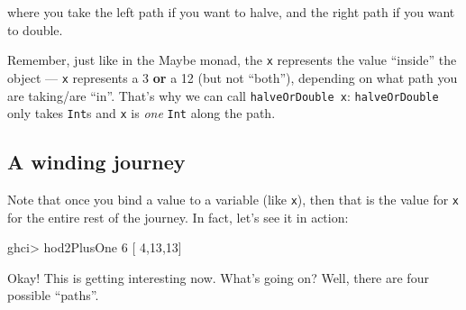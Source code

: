 \documentclass[]{article}
\newenvironment{Shaded}{}{}
\newcommand{\KeywordTok}[1]{\textcolor[rgb]{0.00,0.44,0.13}{\textbf{{#1}}}}
\newcommand{\DataTypeTok}[1]{\textcolor[rgb]{0.56,0.13,0.00}{{#1}}}
\newcommand{\DecValTok}[1]{\textcolor[rgb]{0.25,0.63,0.44}{{#1}}}
\newcommand{\CommentTok}[1]{\textcolor[rgb]{0.38,0.63,0.69}{\textit{{#1}}}}
\newcommand{\OtherTok}[1]{\textcolor[rgb]{0.00,0.44,0.13}{{#1}}}
\newcommand{\FunctionTok}[1]{\textcolor[rgb]{0.02,0.16,0.49}{{#1}}}
\newcommand{\NormalTok}[1]{{#1}}
\begin{document}
where you take the left path if you want to halve, and the right path if
you want to double.

Remember, just like in the Maybe monad, the \texttt{x} represents the
value ``inside'' the object --- \texttt{x} represents a 3 \textbf{or} a
12 (but not ``both''), depending on what path you are taking/are ``in''.
That's why we can call \texttt{halveOrDouble\ x}: \texttt{halveOrDouble}
only takes \texttt{Int}s and \texttt{x} is \emph{one} \texttt{Int} along
the path.

\subsection{A winding journey}\label{a-winding-journey}

Note that once you bind a value to a variable (like \texttt{x}), then
that is the value for \texttt{x} for the entire rest of the journey. In
fact, let's see it in action:

\begin{Shaded}
\end{Shaded}

\begin{Shaded}
\begin{Highlighting}[]
\NormalTok{ghci}\FunctionTok{>} \NormalTok{hod2PlusOne }\DecValTok{6}
\NormalTok{[   }\DecValTok{4}\NormalTok{,}\DecValTok{13}\NormalTok{,}\DecValTok{13}\NormalTok{]}
\end{Highlighting}
\end{Shaded}

Okay! This is getting interesting now. What's going on? Well, there are
four possible ``paths''.
\end{document}
